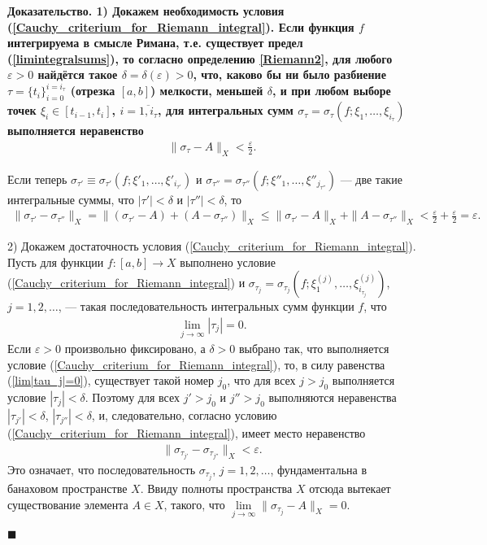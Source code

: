 \documentclass{report}
\newenvironment{Proof}{\par\noindent\bf Доказательство.\rm}{ $\blacksquare$\par}
\begin{document}
\begin{Proof}
1) Докажем необходимость условия (\ref{Cauchy_criterium_for_Riemann_integral}). Если функция $f$ интегрируема в смысле Римана, т.е. существует предел (\ref{limintegralsums}), то согласно
определению \ref{Riemann2}, для любого $\varepsilon>0$ найдётся такое $\delta=\delta(\varepsilon)>0$, что, каково бы ни было разбиение $\tau=\{t_i\}^{i=i_\tau}_{i=0}$ (отрезка $[a,b]$)
мелкости, меньшей $\delta$, и при любом выборе точек $\xi_i\in[t_{i-1},t_i]$, $i=\overline{1,i_\tau}$, для интегральных сумм $\sigma_\tau=\sigma_{\tau}(f;\xi_1,\dots,\xi_{i_{\tau}})$
выполняется неравенство
\begin{gather*}
\|\sigma_\tau-A\|_X<\frac\varepsilon2.
\end{gather*}

Если теперь $\sigma_{\tau'}\equiv\sigma_{\tau'}(f;\xi'_1,\dots,\xi'_{i_{\tau'}})$ и $\sigma_{\tau''}=\sigma_{\tau''}(f;\xi''_1,\dots,\xi''_{j_{\tau''}})$ --- две такие интегральные суммы,
что $|\tau'|<\delta$ и $|\tau''|<\delta$, то
\begin{gather*}
\|\sigma_{\tau'}-\sigma_{\tau''}\|_X=\|(\sigma_{\tau'}-A)+(A-\sigma_{\tau''})\|_X\leqslant\|\sigma_{\tau'}-A\|_X+\|A-\sigma_{\tau''}\|_X<\frac\varepsilon2+\frac\varepsilon2=\varepsilon.
\end{gather*}

2) Докажем достаточность условия (\ref{Cauchy_criterium_for_Riemann_integral}). Пусть для функции $f\colon[a,b]\to X$ выполнено условие (\ref{Cauchy_criterium_for_Riemann_integral}) и
$\sigma_{\tau_j}=\sigma_{\tau_j}(f;\xi^{(j)}_1,\dots,\xi^{(j)}_{i_{\tau_j}})$, $j=1,2,\dots$, --- такая последовательность интегральных сумм функции $f$, что
\begin{gather}\label{lim|tau_j|=0}
\lim\limits_{j\to\infty}|\tau_j|=0.
\end{gather}
Если  $\varepsilon>0$ произвольно фиксировано, а $\delta>0$ выбрано так, что выполняется условие (\ref{Cauchy_criterium_for_Riemann_integral}), то, в силу равенства (\ref{lim|tau_j|=0}),
существует такой номер $j_0$, что для всех $j>j_0$ выполняется условие $|\tau_j|<\delta$. Поэтому для всех $j'>j_0$ и $j''>j_0$ выполняются неравенства  $|\tau_{j'}|<\delta$,
$|\tau_{j''}|<\delta$, и, следовательно, согласно условию (\ref{Cauchy_criterium_for_Riemann_integral}), имеет место неравенство
\begin{gather*}
\|\sigma_{\tau_{j'}}-\sigma_{\tau_{j''}}\|_X<\varepsilon.
\end{gather*}
Это означает, что последовательность $\sigma_{\tau_j}$, $j=1,2,\dots$, фундаментальна в банаховом пространстве $X$. Ввиду полноты
пространства $X$ отсюда вытекает существование элемента $A\in X$, такого, что $\lim\limits_{j\to\infty}\|\sigma_{\tau_j}-A\|_X=0$.


\end{Proof}
\end{document}
